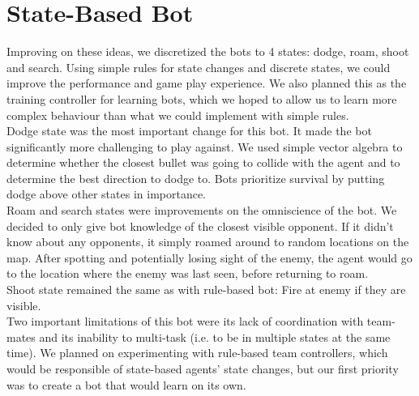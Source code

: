 \documentclass{article}
\begin{document}
	\section{State-Based Bot}
	Improving on these ideas, we discretized the bots to 4 states: dodge, roam, shoot and search. Using simple rules for state changes and discrete states, we could improve the performance and game play experience. We also planned this as the training controller for learning bots, which we hoped to allow us to learn more complex behaviour than what we could implement with simple rules. \\
	Dodge state was the most important change for this bot. It made the bot significantly more challenging to play against. We used simple vector algebra to determine whether the closest bullet was going to collide with the agent and to determine the best direction to dodge to. Bots prioritize survival by putting dodge above other states in importance. \\
	Roam and search states were improvements on the omniscience of the bot. We decided to only give bot knowledge of the closest visible opponent. If it didn't know about any opponents, it simply roamed around to random locations on the map. After spotting and potentially losing sight of the enemy, the agent would go to the location where the enemy was last seen, before returning to roam. \\
	Shoot state remained the same as with rule-based bot: Fire at enemy if they are visible. \\
	Two important limitations of this bot were its lack of coordination with team-mates and its inability to multi-task (i.e. to be in multiple states at the same time). We planned on experimenting with rule-based team controllers,  which would be responsible of state-based agents' state changes, but our first priority was to create a bot that would learn on its own.
	
	
\end{document}
